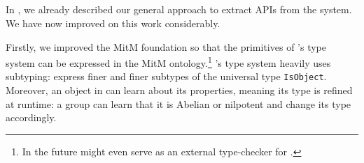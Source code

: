 

\subsection{\GAP}

In \cite{DehKohKon:iop16}, we already described our general approach to extract APIs from the \GAP system.
We have now improved on this work considerably.

Firstly, we improved the MitM foundation so that the primitives of \GAP's type system can be expressed in the MitM ontology.\footnote{In the future \MMT might even serve as an   external type-checker for \GAP.}  \GAP's type system heavily uses subtyping:  express finer and finer subtypes of the universal type \lstinline|IsObject|.  
Moreover, an object in \GAP can learn about its properties, meaning its type is refined at runtime: a group can learn that it is Abelian or nilpotent and change its type accordingly.

